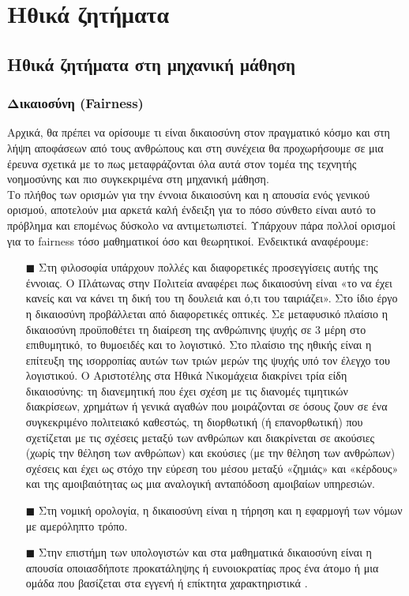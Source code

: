 \chapter{Ηθικά ζητήματα}
\section{Ηθικά ζητήματα στη μηχανική μάθηση}
\subsection{Δικαιοσύνη (Fairness)}
\noindent Αρχικά, θα πρέπει να ορίσουμε τι είναι δικαιοσύνη στον πραγματικό κόσμο και στη λήψη αποφάσεων από τους ανθρώπους και στη συνέχεια θα προχωρήσουμε σε μια έρευνα σχετικά με το πως μεταφράζονται όλα αυτά στον τομέα της τεχνητής νοημοσύνης και πιο συγκεκριμένα στη μηχανική μάθηση.\\
Το πλήθος των ορισμών για την έννοια δικαιοσύνη και η απουσία ενός γενικού ορισμού, αποτελούν μια αρκετά καλή ένδειξη για το πόσο σύνθετο είναι αυτό το πρόβλημα και επομένως δύσκολο να αντιμετωπιστεί. Υπάρχουν πάρα πολλοί ορισμοί για το fairness τόσο μαθηματικοί όσο και θεωρητικοί. Ενδεικτικά αναφέρουμε:
\begin{itemize}
	\item[$\blacksquare$] 
Στη φιλοσοφία υπάρχουν πολλές και διαφορετικές προσεγγίσεις αυτής της έννοιας. Ο Πλάτωνας στην Πολιτεία αναφέρει πως δικαιοσύνη είναι «το να έχει κανείς και να κάνει τη δική του τη δουλειά και ό,τι του ταιριάζει». Στο ίδιο έργο η δικαιοσύνη προβάλλεται από διαφορετικές οπτικές. Σε μεταφυσικό πλαίσιο η δικαιοσύνη προϋποθέτει τη διαίρεση της ανθρώπινης ψυχής σε 3 μέρη στο επιθυμητικό, το θυμοειδές και το λογιστικό. Στο πλαίσιο της ηθικής είναι η επίτευξη της ισορροπίας αυτών των τριών μερών της ψυχής υπό τον έλεγχο του λογιστικού. Ο Αριστοτέλης στα Ηθικά Νικομάχεια διακρίνει τρία είδη δικαιοσύνης: τη διανεμητική που έχει σχέση με τις διανομές τιμητικών διακρίσεων, χρημάτων ή γενικά αγαθών που μοιράζονται σε όσους ζουν σε ένα συγκεκριμένο πολιτειακό καθεστώς, τη διορθωτική (ή επανορθωτική) που σχετίζεται με τις σχέσεις μεταξύ των ανθρώπων και διακρίνεται σε ακούσιες (χωρίς την θέληση των ανθρώπων) και εκούσιες (με την θέληση των ανθρώπων) σχέσεις και έχει ως στόχο την εύρεση του μέσου μεταξύ «ζημιάς» και «κέρδους» και της αμοιβαιότητας ως μια αναλογική ανταπόδοση αμοιβαίων υπηρεσιών.
\item[$\blacksquare$] Στη νομική ορολογία, η δικαιοσύνη είναι η τήρηση και η εφαρμογή των νόμων με αμερόληπτο τρόπο.
\item[$\blacksquare$] Στην επιστήμη των υπολογιστών και στα μαθηματικά δικαιοσύνη είναι η απουσία
οποιασδήποτε προκατάληψης ή ευνοιοκρατίας προς ένα άτομο ή μια ομάδα που βασίζεται στα εγγενή ή επίκτητα
χαρακτηριστικά \cite{mehrabiSurveyBiasFairness2021}. 
\end{itemize}
